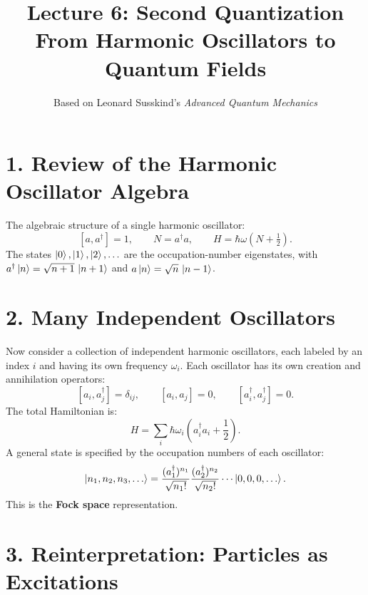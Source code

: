\documentclass[12pt,a4paper]{article}
\title{\textbf{Lecture 6: Second Quantization} \\ \large From Harmonic Oscillators to Quantum Fields}
\author{Based on Leonard Susskind's \textit{Advanced Quantum Mechanics}}
\date{}
\begin{document}
\maketitle
\thispagestyle{fancy}

\section{1. Review of the Harmonic Oscillator Algebra}

The algebraic structure of a single harmonic oscillator:
\[
    [a, a^\dagger] = 1, \qquad N = a^\dagger a, \qquad H = \hbar\omega\left(N + \tfrac{1}{2}\right).
\]
The states $\ket{0}, \ket{1}, \ket{2}, \ldots$ are the occupation-number eigenstates, with $a^\dagger\ket{n} = \sqrt{n+1}\,\ket{n+1}$ and $a\ket{n} = \sqrt{n}\,\ket{n-1}$.

\section{2. Many Independent Oscillators}

Now consider a collection of independent harmonic oscillators, each labeled by an index $i$ and having its own frequency $\omega_i$.  Each oscillator has its own creation and annihilation operators:
\[
    [a_i, a_j^\dagger] = \delta_{ij}, \qquad [a_i, a_j] = 0, \qquad [a_i^\dagger, a_j^\dagger] = 0.
\]
The total Hamiltonian is:
\[
    H = \sum_i \hbar\omega_i\left(a_i^\dagger a_i + \frac{1}{2}\right).
\]
A general state is specified by the occupation numbers of each oscillator:
\[
    \ket{n_1, n_2, n_3, \ldots} = \frac{(a_1^\dagger)^{n_1}}{\sqrt{n_1!}}\frac{(a_2^\dagger)^{n_2}}{\sqrt{n_2!}}\cdots\ket{0, 0, 0, \ldots}.
\]
This is the \textbf{Fock space} representation.

\section{3. Reinterpretation: Particles as Excitations}
\end{document}
